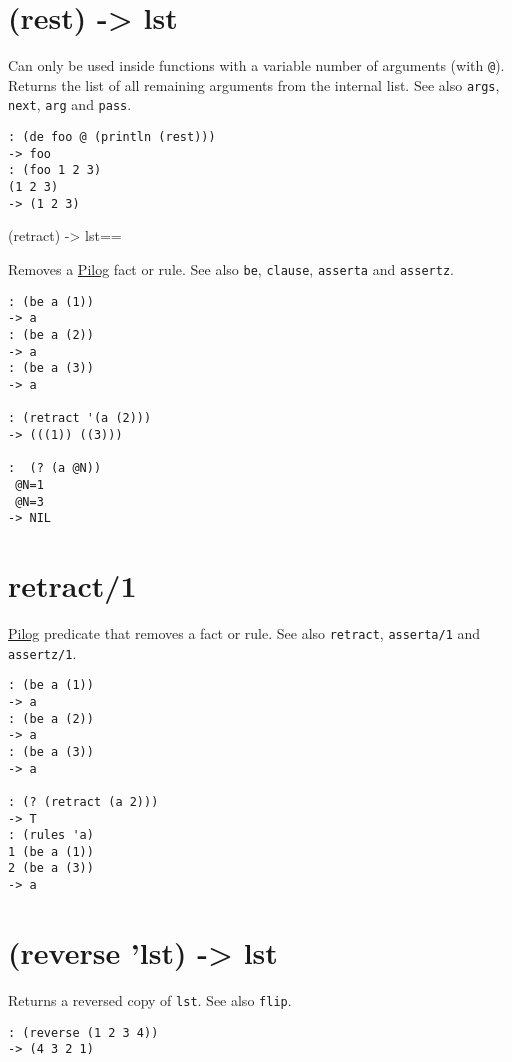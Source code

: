 {{{{{{{{ 
\section{(rest) -> lst}
\label{sec-8-1-18-23}


Can only be used inside functions with a variable number of arguments
(with \texttt{@}). Returns the list of all remaining arguments from the
internal list. See also \texttt{args}, \texttt{next}, \texttt{arg} and \texttt{pass}.


\begin{verbatim}
: (de foo @ (println (rest)))
-> foo
: (foo 1 2 3)
(1 2 3)
-> (1 2 3)
\end{verbatim}

(retract) -> lst==

Removes a \hyperref[ref.html-pilog]{Pilog} fact or rule. See also \texttt{be},
\texttt{clause}, \texttt{asserta} and \texttt{assertz}.


\begin{verbatim}
: (be a (1))
-> a
: (be a (2))
-> a
: (be a (3))
-> a

: (retract '(a (2)))
-> (((1)) ((3)))

:  (? (a @N))
 @N=1
 @N=3
-> NIL
\end{verbatim}

 
\section{retract/1}
\label{sec-8-1-18-24}


\hyperref[ref.html-pilog]{Pilog} predicate that removes a fact or rule. See
also \texttt{retract}, \texttt{asserta/1} and \texttt{assertz/1}.


\begin{verbatim}
: (be a (1))
-> a
: (be a (2))
-> a
: (be a (3))
-> a

: (? (retract (a 2)))
-> T
: (rules 'a)
1 (be a (1))
2 (be a (3))
-> a
\end{verbatim}

 
\section{(reverse 'lst) -> lst}
\label{sec-8-1-18-25}


Returns a reversed copy of \texttt{lst}. See also \texttt{flip}.


\begin{verbatim}
: (reverse (1 2 3 4))
-> (4 3 2 1)
\end{verbatim}

}}}}}}}}
